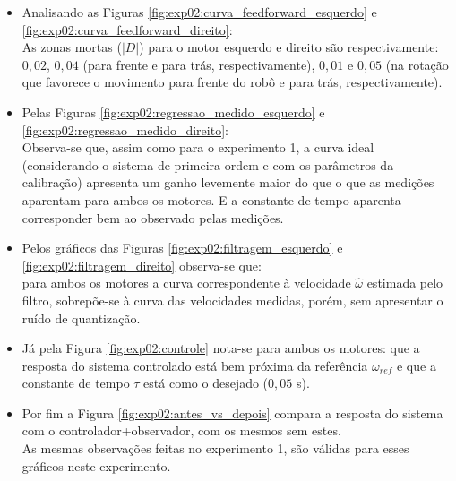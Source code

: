 \begin{itemize}
    \item Analisando as Figuras \ref{fig:exp02:curva_feedforward_esquerdo} e \ref{fig:exp02:curva_feedforward_direito}:\\
        As zonas mortas ($|D|$) para o motor esquerdo e direito são respectivamente: $0,02$, $0,04$ (para frente e para trás, respectivamente), $0,01$ e $0,05$ (na rotação que favorece o movimento para frente do robô e para trás, respectivamente).
    \item Pelas Figuras \ref{fig:exp02:regressao_medido_esquerdo} e \ref{fig:exp02:regressao_medido_direito}:\\
        Observa-se que, assim como para o experimento 1, a curva ideal (considerando o sistema de primeira ordem e com os parâmetros da calibração) apresenta um ganho levemente maior do que o que as medições aparentam para ambos os motores. E a constante de tempo aparenta corresponder bem ao observado pelas medições.
    \item Pelos gráficos das Figuras \ref{fig:exp02:filtragem_esquerdo} e \ref{fig:exp02:filtragem_direito} observa-se que:\\
        para ambos os motores a curva correspondente à velocidade $\hat{\omega}$ estimada pelo filtro, sobrepõe-se à curva das velocidades medidas, porém, sem apresentar o ruído de quantização.
    \item Já pela Figura \ref{fig:exp02:controle} nota-se para ambos os motores:
        que a resposta do sistema controlado está bem próxima da referência $\omega_{ref}$ e que a constante de tempo $\tau$ está como o desejado ($0,05$ s).
    \item Por fim a Figura \ref{fig:exp02:antes_vs_depois} compara a resposta do sistema com o controlador+observador, com os mesmos sem estes. \\
        As mesmas observações feitas no experimento 1, são válidas para esses gráficos neste experimento.
\end{itemize}

